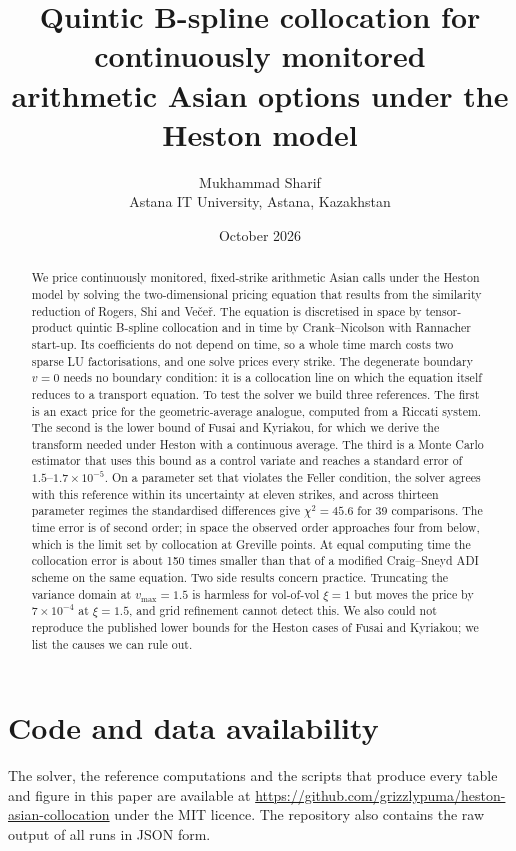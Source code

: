\documentclass[11pt]{article}
\title{Quintic B-spline collocation for continuously monitored\\ arithmetic Asian options under the Heston model}
\author{Mukhammad Sharif\\[2pt]
\small Astana IT University, Astana, Kazakhstan}
\date{October 2026}
\begin{document}
\maketitle

\begin{abstract}
We price continuously monitored, fixed-strike arithmetic Asian calls under the Heston model by solving
the two-dimensional pricing equation that results from the similarity reduction of Rogers, Shi and
Ve\v{c}e\v{r}. The equation is discretised in space by tensor-product quintic B-spline collocation and in
time by Crank--Nicolson with Rannacher start-up. Its coefficients do not depend on time, so a whole time
march costs two sparse LU factorisations, and one solve prices every strike. The degenerate boundary
$v=0$ needs no boundary condition: it is a collocation line on which the equation itself reduces to a
transport equation. To test the solver we build three references. The first is an exact price for the
geometric-average analogue, computed from a Riccati system. The second is the lower bound of Fusai and
Kyriakou, for which we derive the transform needed under Heston with a continuous average. The third is
a Monte Carlo estimator that uses this bound as a control variate and reaches a standard error of
$1.5\text{--}1.7\times10^{-5}$. On a parameter set that violates the Feller condition, the solver
agrees with this reference within its uncertainty at eleven strikes, and across thirteen parameter
regimes the standardised differences give $\chi^2=45.6$ for 39 comparisons. The time error is of second
order; in space the observed order approaches four from below, which is the limit set by collocation at
Greville points. At equal computing time the collocation error is about 150 times smaller than that of a
modified Craig--Sneyd ADI scheme on the same equation. Two side results concern practice. Truncating the
variance domain at $v_{\max}=1.5$ is harmless for vol-of-vol $\xi=1$ but moves the price by
$7\times10^{-4}$ at $\xi=1.5$, and grid refinement cannot detect this. We also could not reproduce the
published lower bounds for the Heston cases of Fusai and Kyriakou; we list the causes we can rule out.
\end{abstract}








\section*{Code and data availability}
The solver, the reference computations and the scripts that produce every table and figure in this
paper are available at \url{https://github.com/grizzlypuma/heston-asian-collocation} under the MIT
licence. The repository also contains the raw output of all runs in JSON form.
\end{document}
